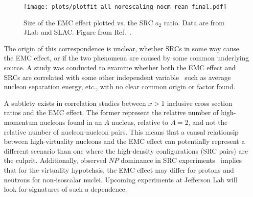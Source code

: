 \begin{figure}[htb]
  \texttt{[image: plots/plotfit\_all\_norescaling\_nocm\_rean\_final.pdf]}
  \caption{Size of the EMC effect plotted vs. the SRC $a_2$ ratio. Data are from JLab and SLAC. Figure
  from Ref.~\cite{Arrington:2012ax}.}
  \label{fig:emc_src_bff}
\end{figure}

The origin of this correspondence is unclear, whether SRCs in some way cause the EMC effect, or if the two
phenomena are caused by some common underlying source.  A study was conducted to examine whether
both the EMC effect and SRCs are correlated with some other independent variable~\cite{Arrington:2012ax} such
as average nucleon separation energy, etc., with no clear common origin or factor found.

A subtlety exists in correlation studies between $x>1$ inclusive cross section ratios and the EMC effect.  The former represent the relative number of high-momentum nucleons found in an $A$ nucleus, relative to $A=2$, and not the relative number of nucleon-nucleon pairs.  This means that a causal relationsip between high-virtuality nucleons and the EMC effect can potentially represent a different scenario than one where the high-density configurations (SRC pairs) are the culprit.  Additionally, observed $NP$ dominance in SRC experiments~\cite{Subedi:2008zz} implies that for the virtuality hypotehsis, the EMC effect may differ for protons and neutrons for non-isoscalar nuclei.  Upcoming experiments at Jefferson Lab will look for signatures of such a dependence. 
